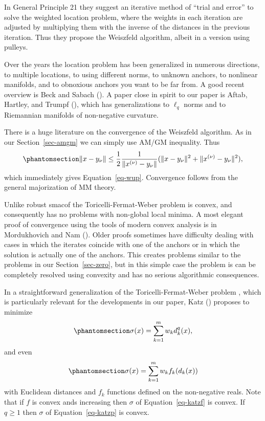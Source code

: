 \documentclass[
  12pt,
  letterpaper,
  DIV=11,
  numbers=noendperiod]{scrartcl}
\theoremstyle{plain}
\theoremstyle{plain}
\theoremstyle{plain}
\theoremstyle{definition}
\theoremstyle{definition}
\theoremstyle{remark}
\begin{document}
In General Principle 21 they suggest an iterative method of ``trial and
error'' to solve the weighted location problem, where the weights in
each iteration are adjusted by multiplying them with the inverse of the
distances in the previous iteration. Thus they propose the Weiszfeld
algorithm, albeit in a version using pulleys.

Over the years the location problem has been generalized in numerous
directions, to multiple locations, to using different norms, to unknown
anchors, to nonlinear manifolds, and to obnoxious anchors you want to be
far from. A good recent overview is Beck and Sabach
(). A paper close in spirit to our
paper is Aftab, Hartley, and Trumpf
(), which has
generalizations to \(\ell_q\) norms and to Riemannian manifolds of
non-negative curvature.

There is a huge literature on the convergence of the Weiszfeld
algorithm. As in our Section~\ref{sec-amgm} we can simply use AM/GM
inequality. Thus \begin{equation}\phantomsection\label{eq-webamgm}{
\|x-y_\nu\|\leq\frac12\frac{1}{\|x^{(\nu)}-y_\nu\|}(\|x-y_\nu\|^2+\|x^{(\nu)}-y_\nu\|^2),
}\end{equation} which immediately gives Equation~\ref{eq-wup}.
Convergence follows from the general majorization of MM theory.

Unlike robust smacof the Toricelli-Fermat-Weber problem is convex, and
consequently has no problems with non-global local minima. A most
elegant proof of convergence using the tools of modern convex analysis
is in Mordukhovich and Nam ().
Older proofs sometimes have difficulty dealing with cases in which the
iterates coincide with one of the anchors or in which the solution is
actually one of the anchors. This creates problems similar to the
problems in our Section~\ref{sec-zero}, but in this simple case the
problem is can be completely resolved using convexity and has no serious
algorithmic consequences.

In a straightforward generalization of the Toricelli-Fermat-Weber
problem , which is particularly relevant for the developments in our
paper, Katz () proposes to minimize
\begin{equation}\phantomsection\label{eq-katzp}{
\sigma(x)=\sum_{k=1}^mw_kd_k^q(x),
}\end{equation} and even
\begin{equation}\phantomsection\label{eq-katzf}{
\sigma(x)=\sum_{k=1}^mw_kf_k(d_k(x))
}\end{equation} with Euclidean distances and \(f_k\) functions defined
on the non-negative reals. Note that if \(f\) is convex ands increasing
then \(\sigma\) of Equation~\ref{eq-katzf} is convex. If \(q\geq 1\)
then \(\sigma\) of Equation~\ref{eq-katzp} is convex.
\end{document}
